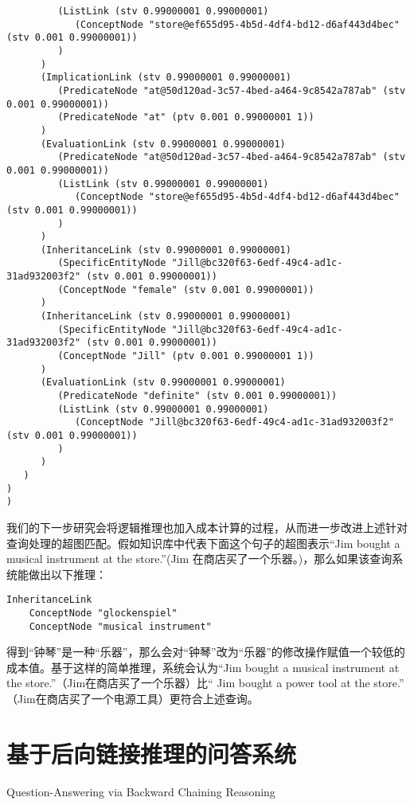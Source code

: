 {\begin{tiny}
\begin{lstlisting}
         (ListLink (stv 0.99000001 0.99000001)
            (ConceptNode "store@ef655d95-4b5d-4df4-bd12-d6af443d4bec" (stv 0.001 0.99000001))
         )
      )
      (ImplicationLink (stv 0.99000001 0.99000001)
         (PredicateNode "at@50d120ad-3c57-4bed-a464-9c8542a787ab" (stv 0.001 0.99000001))
         (PredicateNode "at" (ptv 0.001 0.99000001 1))
      )
      (EvaluationLink (stv 0.99000001 0.99000001)
         (PredicateNode "at@50d120ad-3c57-4bed-a464-9c8542a787ab" (stv 0.001 0.99000001))
         (ListLink (stv 0.99000001 0.99000001)
            (ConceptNode "store@ef655d95-4b5d-4df4-bd12-d6af443d4bec" (stv 0.001 0.99000001))
         )
      )
      (InheritanceLink (stv 0.99000001 0.99000001)
         (SpecificEntityNode "Jill@bc320f63-6edf-49c4-ad1c-31ad932003f2" (stv 0.001 0.99000001))
         (ConceptNode "female" (stv 0.001 0.99000001))
      )
      (InheritanceLink (stv 0.99000001 0.99000001)
         (SpecificEntityNode "Jill@bc320f63-6edf-49c4-ad1c-31ad932003f2" (stv 0.001 0.99000001))
         (ConceptNode "Jill" (ptv 0.001 0.99000001 1))
      )
      (EvaluationLink (stv 0.99000001 0.99000001)
         (PredicateNode "definite" (stv 0.001 0.99000001))
         (ListLink (stv 0.99000001 0.99000001)
            (ConceptNode "Jill@bc320f63-6edf-49c4-ad1c-31ad932003f2" (stv 0.001 0.99000001))
         )
      )
   )
)
)

\end{lstlisting}\end{tiny}}

我们的下一步研究会将逻辑推理也加入成本计算的过程，从而进一步改进上述针对查询处理的超图匹配。假如知识库中代表下面这个句子的超图表示“Jim bought a musical instrument at the store.”(Jim 在商店买了一个乐器。)，那么如果该查询系统能做出以下推理：

\begin{verbatim}
InheritanceLink
	ConceptNode "glockenspiel"
	ConceptNode "musical instrument"
\end{verbatim}

得到“钟琴”是一种“乐器”，那么会对“钟琴”改为“乐器”的修改操作赋值一个较低的成本值。基于这样的简单推理，系统会认为“Jim bought a musical instrument at the store.”（Jim在商店买了一个乐器）比“ Jim bought a power tool at the store.” （Jim在商店买了一个电源工具）更符合上述查询。

\section{基于后向链接推理的问答系统}{Question-Answering via Backward Chaining Reasoning}
\label{sec:backward}

